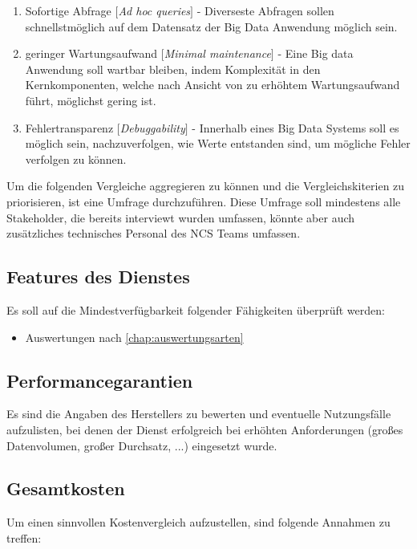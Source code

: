 \begin{enumerate}
\item Sofortige Abfrage $\lbrack$\textit{Ad hoc queries}$\rbrack$ - 
Diverseste Abfragen sollen schnellstmöglich auf dem Datensatz der Big Data Anwendung möglich sein.

\item geringer Wartungsaufwand $\lbrack$\textit{Minimal maintenance}$\rbrack$ - 
Eine Big data Anwendung soll wartbar bleiben, indem Komplexität in den Kernkomponenten, welche nach Ansicht von \citeauthor{Marz.2015} zu erhöhtem Wartungsaufwand führt, möglichst gering ist.

\item Fehlertransparenz $\lbrack$\textit{Debuggability}$\rbrack$ - 
Innerhalb eines Big Data Systems soll es möglich sein, nachzuverfolgen, wie Werte entstanden sind, um mögliche Fehler verfolgen zu können.
\end{enumerate}

Um die folgenden Vergleiche aggregieren zu können und die Vergleichskiterien zu priorisieren, ist eine Umfrage durchzuführen. Diese Umfrage soll mindestens alle Stakeholder, die bereits interviewt wurden umfassen, könnte aber auch zusätzliches technisches Personal des \ac{NCS} Teams umfassen. 


\subsection{Features des Dienstes}
Es soll auf die Mindestverfügbarkeit folgender Fähigkeiten überprüft werden:
\begin{itemize}
\item Auswertungen nach \autoref{chap:auswertungsarten}
\end{itemize}


\subsection{Performancegarantien}
Es sind die Angaben des Herstellers zu bewerten und eventuelle Nutzungsfälle aufzulisten, bei denen der Dienst erfolgreich bei erhöhten Anforderungen (großes Datenvolumen, großer Durchsatz, ...) eingesetzt wurde.

\subsection{Gesamtkosten}
Um einen sinnvollen Kostenvergleich aufzustellen, sind folgende Annahmen zu treffen:

